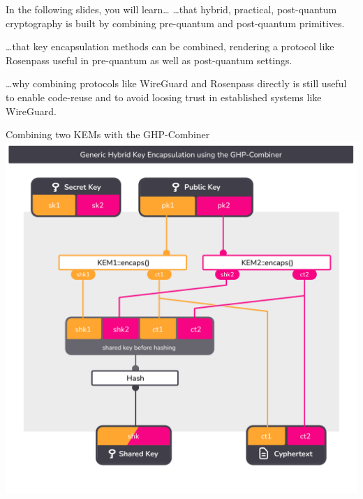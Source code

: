 
\begin{frame}[light]{In the following slides, you will learn…}
  …that hybrid, practical, post-quantum cryptography is built by combining pre-quantum and post-quantum primitives.

  \vspace{2em}
  …that key encapsulation methods can be combined, rendering a protocol like Rosenpass useful in pre-quantum as well
  as post-quantum settings.

  \vspace{2em}
  …why combining protocols like WireGuard and Rosenpass directly is still useful to enable code-reuse and to avoid
  loosing trust in established systems like WireGuard.
\end{frame}

\begin{frame}{Combining two KEMs with the GHP-Combiner}
  \centering
  \includegraphics[height=.92\textheight,page=1,clip=true,trim={0.5cm 1cm 0.7cm 1.5cm}]{graphics/rosenpass-encapsulation-combiner.pdf}
\end{frame}

